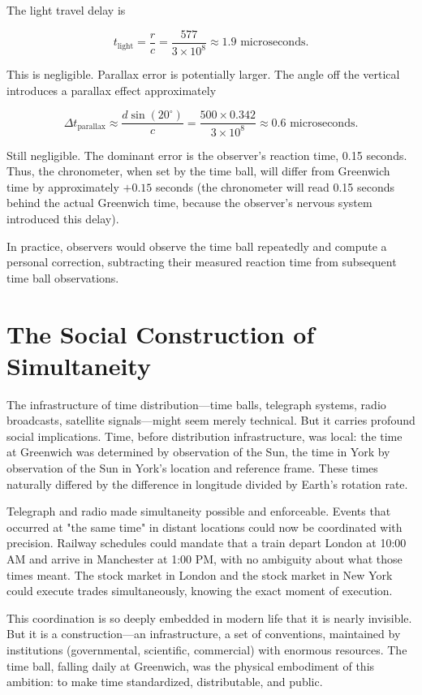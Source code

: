 The light travel delay is

\[
  t_{\text{light}} = \frac{r}{c} = \frac{577}{3 \times 10^8} \approx 1.9 \text{ microseconds}.
\]

This is negligible. Parallax error is potentially larger. The angle off the vertical introduces a parallax effect approximately

\[
  \Delta t_{\text{parallax}} \approx \frac{d \sin(20^{\circ})}{c} = \frac{500 \times 0.342}{3 \times 10^8} \approx 0.6 \text{ microseconds}.
\]

Still negligible. The dominant error is the observer's reaction time, 0.15 seconds. Thus, the chronometer, when set by the time ball, will differ from Greenwich time by approximately $+0.15$ seconds (the chronometer will read 0.15 seconds behind the actual Greenwich time, because the observer's nervous system introduced this delay).

In practice, observers would observe the time ball repeatedly and compute a personal correction, subtracting their measured reaction time from subsequent time ball observations.

\section{The Social Construction of Simultaneity}

The infrastructure of time distribution—time balls, telegraph systems, radio broadcasts, satellite signals—might seem merely technical. But it carries profound social implications. Time, before distribution infrastructure, was local: the time at Greenwich was determined by observation of the Sun, the time in York by observation of the Sun in York's location and reference frame. These times naturally differed by the difference in longitude divided by Earth's rotation rate.

Telegraph and radio made simultaneity possible and enforceable. Events that occurred at "the same time" in distant locations could now be coordinated with precision. Railway schedules could mandate that a train depart London at 10:00 AM and arrive in Manchester at 1:00 PM, with no ambiguity about what those times meant. The stock market in London and the stock market in New York could execute trades simultaneously, knowing the exact moment of execution.

This coordination is so deeply embedded in modern life that it is nearly invisible. But it is a construction—an infrastructure, a set of conventions, maintained by institutions (governmental, scientific, commercial) with enormous resources. The time ball, falling daily at Greenwich, was the physical embodiment of this ambition: to make time standardized, distributable, and public.


